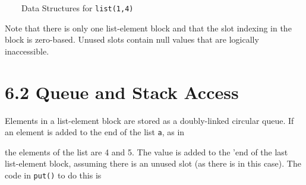 \ \ \ \ Data Structures for \texttt{list(1,4)}


Note that there is only one list-element block and that the slot
indexing in the block is zero-based. Unused slots contain null values
that are logically inaccessible.

\section[6.2 Queue and Stack Access]{6.2 Queue and Stack Access}

Elements in a list-element block are stored as a doubly-linked
circular queue. If an element is added to the end of the list
\texttt{a}, as in


\noindent the elements of the list are 4 and 5. The value is added to
the '{\textquotedbl}end{\textquotedbl} of the last list-element block,
assuming there is an unused slot (as there is in this case). The code
in \texttt{put()} to do this is

